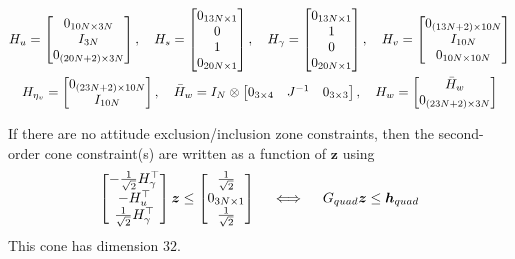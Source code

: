 \documentclass[10pt]{article}
\begin{document}
\begin{gather*}
H_u = \begin{bmatrix}
0_{10N \times 3N} \\ I_{3N} \\ 0_{(20N+2) \times 3N}
\end{bmatrix}, \quad H_s = \begin{bmatrix}
0_{13N \times 1} \\ 0 \\ 1 \\ 0_{20N \times 1}
\end{bmatrix}, \quad H_{\gamma} = \begin{bmatrix}
0_{13N \times 1} \\ 1 \\ 0 \\ 0_{20N \times 1}
\end{bmatrix}, \quad H_v = \begin{bmatrix}
0_{(13N+2) \times 10N} \\ I_{10N} \\ 0_{10N \times 10N} 
\end{bmatrix}  \\
H_{\eta_v} = \begin{bmatrix}
0_{(23N+2) \times 10N} \\ I_{10N}
\end{bmatrix}, \quad
\bar{H}_w = I_{N} \otimes \begin{bmatrix}
0_{3 \times 4} & J^{-1} & 0_{3 \times 3}
\end{bmatrix}, \quad H_w = \begin{bmatrix}
\bar{H}_w \\ 0_{(23N+2) \times 3N} 
\end{bmatrix}
\end{gather*}

If there are no attitude exclusion/inclusion zone constraints, then the second-order cone constraint(s) are written as a function of $\bm{z}$ using
\begin{equation}
\begin{bmatrix}
-\frac{1}{\sqrt{2}}H_{\gamma}^{\top} \\ -H_u^{\top} \\ \frac{1}{\sqrt{2}} H_{\gamma}^{\top}
\end{bmatrix} \bm{z} \leq \begin{bmatrix} 
\frac{1}{\sqrt{2}} \\ 0_{3N \times 1} \\ \frac{1}{\sqrt{2}}
\end{bmatrix} \quad \iff \quad G_{quad} \bm{z} \leq \bm{h}_{quad}
\label{eq:std_b_quad}
\end{equation}
This cone has dimension $32$. 
\end{document}
